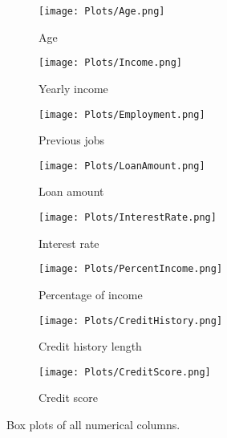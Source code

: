 \begin{figure}[H]
    \centering
    \begin{subfigure}[b]{0.22\textwidth}
        \centering
        \texttt{[image: Plots/Age.png]}
        \caption{Age}
        \label{fig:Boxplot1}
    \end{subfigure}
    \hfill
    \begin{subfigure}[b]{0.22\textwidth}
        \centering
        \texttt{[image: Plots/Income.png]}
        \caption{Yearly income}
        \label{fig:Boxplot2}
    \end{subfigure}
    \hfill
    \begin{subfigure}[b]{0.22\textwidth}
        \centering
        \texttt{[image: Plots/Employment.png]}
        \caption{Previous jobs}
        \label{fig:Boxplot3}
    \end{subfigure}
    \hfill
    \begin{subfigure}[b]{0.22\textwidth}
        \centering
        \texttt{[image: Plots/LoanAmount.png]}
        \caption{Loan amount}
        \label{fig:Boxplot4}
    \end{subfigure}
    
    \vspace{1em}
    
    \begin{subfigure}[b]{0.22\textwidth}
        \centering
        \texttt{[image: Plots/InterestRate.png]}
        \caption{Interest rate}
        \label{fig:Boxplot5}
    \end{subfigure}
    \hfill
    \begin{subfigure}[b]{0.22\textwidth}
        \centering
        \texttt{[image: Plots/PercentIncome.png]}
        \caption{Percentage of income}
        \label{fig:Boxplot6}
    \end{subfigure}
    \hfill
    \begin{subfigure}[b]{0.22\textwidth}
        \centering
        \texttt{[image: Plots/CreditHistory.png]}
        \caption{Credit history length}
        \label{fig:Boxplot7}
    \end{subfigure}
    \hfill
    \begin{subfigure}[b]{0.22\textwidth}
        \centering
        \texttt{[image: Plots/CreditScore.png]}
        \caption{Credit score}
        \label{fig:Boxplot8}
    \end{subfigure}
    
    \caption{Box plots of all numerical columns.}
    \label{fig:Boxplots}
\end{figure}

